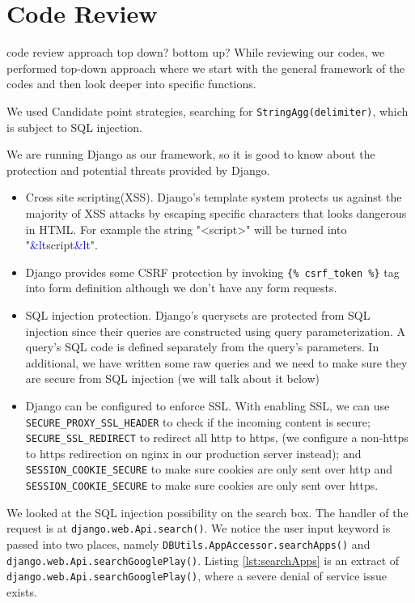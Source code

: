 \documentclass[12pt, a4paper]{article}
\newcommand{\code}[1]{\texttt{#1}}
\begin{document}
\section{Code Review}

code review approach
top down? bottom up?
While reviewing our codes, we performed top-down approach where we start with the general framework of the codes and then look deeper into specific functions.

We used Candidate point strategies, searching for \code{StringAgg(delimiter)}, which is subject to SQL injection.




We are running Django as our framework, so it is good to know about the protection and potential threats provided by Django.
\begin{itemize}
    \item Cross site scripting(XSS). Django's template system protects us against the majority of XSS attacks by escaping specific characters that looks dangerous in HTML. For example the string "<script>" will be turned into "\textcolor{blue}{\&lt}script\textcolor{blue}{\&lt}".
    \item Django provides some CSRF protection by invoking \code{\{\% csrf\_token \%\}} tag into form definition although we don't have any form requests.
    \item SQL injection protection. Django’s querysets are protected from SQL injection since their queries are constructed using query parameterization. A query’s SQL code is defined separately from the query’s parameters. In additional, we have written some raw queries and we need to make sure they are secure from SQL injection (we will talk about it below)
    \item Django can be configured to enforce SSL. With enabling SSL, we can use \code{SECURE\_PROXY\_SSL\_HEADER} to check if the incoming content is secure; \code{SECURE\_SSL\_REDIRECT} to redirect all http to https, (we configure a non-https to https redirection on nginx in our production server instead); and \code{SESSION\_COOKIE\_SECURE} to make sure cookies are only sent over http and \code{SESSION\_COOKIE\_SECURE} to make sure cookies are only sent over https.
\end{itemize}


We looked at the SQL injection possibility on the search box. The handler of the request is at \code{django.web.Api.search()}. We notice the user input keyword is passed into two places, namely \code{DBUtils.AppAccessor.\linebreak[0]searchApps()} and \code{django.web.Api.searchGooglePlay()}. Listing \ref{lst:searchApps} is an extract of \code{django.web.Api.searchGooglePlay()}, where a severe denial of service issue exists.
\end{document}
